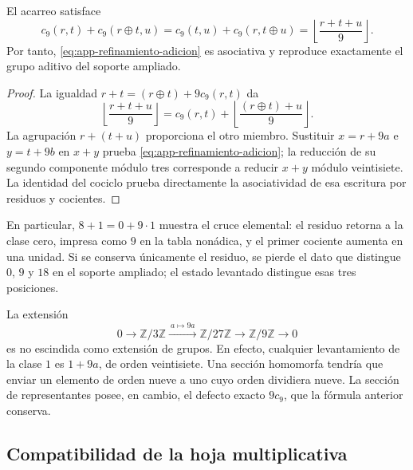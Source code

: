 \begin{proposition}
\label{prop:app-refinamiento-cociclo}
El acarreo satisface
\begin{equation}
 c_9(r,t)+c_9(r\oplus t,u)
 =c_9(t,u)+c_9(r,t\oplus u)
 =\left\lfloor\frac{r+t+u}{9}\right\rfloor.
 \label{eq:app-refinamiento-cociclo}
\end{equation}
Por tanto, \eqref{eq:app-refinamiento-adicion} es asociativa y
reproduce exactamente el grupo aditivo del soporte ampliado.
\end{proposition}
\begin{proof}
La igualdad $r+t=(r\oplus t)+9c_9(r,t)$ da
\[
 \left\lfloor\frac{r+t+u}{9}\right\rfloor
 =c_9(r,t)+\left\lfloor\frac{(r\oplus t)+u}{9}\right\rfloor.
\]
La agrupación $r+(t+u)$ proporciona el otro miembro. Sustituir
$x=r+9a$ e $y=t+9b$ en $x+y$ prueba
\eqref{eq:app-refinamiento-adicion}; la reducción de su segundo
componente módulo tres corresponde a reducir $x+y$ módulo veintisiete.
La identidad del cociclo prueba directamente la asociatividad de esa
escritura por residuos y cocientes.
\end{proof}

En particular, $8+1=0+9\cdot1$ muestra el cruce elemental: el residuo
retorna a la clase cero, impresa como $9$ en la tabla nonádica, y el
primer cociente aumenta en una unidad. Si se conserva únicamente el
residuo, se pierde el dato que distingue $0$, $9$ y $18$ en el soporte
ampliado; el estado levantado distingue esas tres posiciones.

La extensión
\[
 0\longrightarrow\mathbb Z/3\mathbb Z
 \xrightarrow{\ a\mapsto9a\ }
 \mathbb Z/27\mathbb Z
 \longrightarrow\mathbb Z/9\mathbb Z\longrightarrow0
\]
es no escindida como extensión de grupos. En efecto, cualquier
levantamiento de la clase $1$ es $1+9a$, de orden veintisiete. Una
sección homomorfa tendría que enviar un elemento de orden nueve a uno
cuyo orden dividiera nueve. La sección de representantes posee, en
cambio, el defecto exacto $9c_9$, que la fórmula anterior conserva.

\subsection{Compatibilidad de la hoja multiplicativa}

